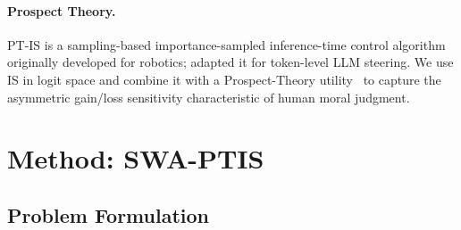 \documentclass{article}
\begin{document}
\paragraph{Prospect Theory.}
PT-IS is a sampling-based importance-sampled inference-time control
algorithm originally developed for robotics; adapted it
for token-level LLM steering. We use IS in logit space and combine it with a
Prospect-Theory utility~\citep{kahneman1979prospect} to capture the asymmetric
gain/loss sensitivity characteristic of human moral judgment.

\section{Method: SWA-PTIS}
\label{sec:method}

\subsection{Problem Formulation}
\label{sec:method:problem}
\end{document}
